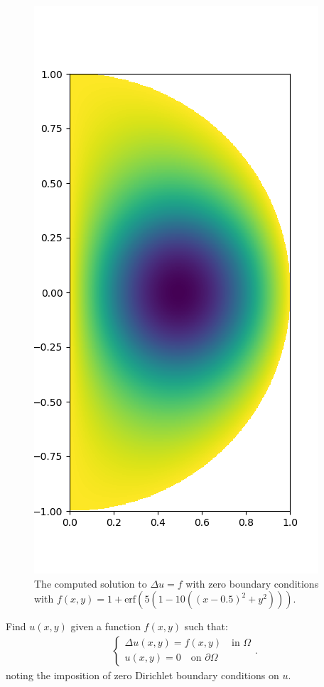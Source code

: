 \documentclass[11pt, oneside]{article}   	%
\begin{document}
\begin{figure}
	\includegraphics[scale=0.3]{solution}
	\centering
	\caption{The computed solution to $\Delta u = f$ with zero boundary conditions with $f(x,y) = 1 + \text{erf}(5(1 - 10((x - 0.5)^2 + y^2)))$.}
        	\label{fig:solution-poisson}
	\centering
\end{figure}

Find \(u(x,y)\) given a function \(f(x,y)\) such that:
\begin{align}
	\begin{cases}
    		\Delta u(x,y) = f(x,y) \quad \text{in } \Omega \\
		u(x,y) = 0 \quad \text{on } \partial \Omega
	\end{cases}.
	\label{eqn:poisson}
\end{align}
noting the imposition of zero Dirichlet boundary conditions on $u$.
\end{document}
